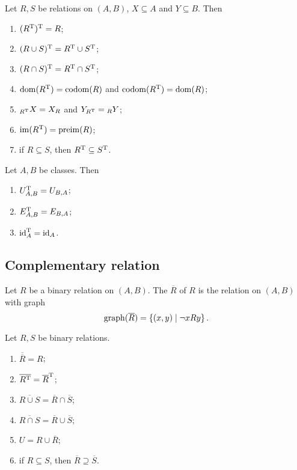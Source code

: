 \begin{lemma}
Let $R,S$ be relations on $(A, B)$, $X\subseteq A$ and $Y\subseteq B$. Then
\begin{enumerate}
\item $(R^{\mathrm{T}})^{\mathrm{T}} = R$;
\item $(R \cup S)^{\mathrm{T}} = R^{\mathrm{T}} \cup S^{\mathrm{T}}$;
\item $(R \cap S)^{\mathrm{T}} = R^{\mathrm{T}} \cap S^{\mathrm{T}}$;
\item $\operatorname{dom}(R^{\mathrm{T}}) = \operatorname{codom}(R)$ and $\operatorname{codom}(R^{\mathrm{T}}) = \operatorname{dom}(R)$;
\item $_{R^{\mathrm{T}}}X = X_R$ and $Y_{R^{\mathrm{T}}} = {_RY}$;
\item $\operatorname{im}(R^{\mathrm{T}}) = \operatorname{preim}(R)$;
\item if $R\subseteq S$, then $R^{\mathrm{T}} \subseteq S^{\mathrm{T}}$.
\end{enumerate}
\end{lemma}

\begin{lemma}
Let $A,B$ be classes. Then
\begin{enumerate}
\item $U_{A,B}^{\mathrm{T}} = U_{B,A}$;
\item $E_{A,B}^{\mathrm{T}} = E_{B,A}$;
\item $\operatorname{id}_A^{\mathrm{T}} = \operatorname{id}_A$.
\end{enumerate}
\end{lemma}

\subsection{Complementary relation}
\begin{definition}
Let $R$ be a binary relation on $(A, B)$. The  $\overline{R}$ of $R$ is the relation on $(A, B)$ with graph
\[ \operatorname{graph}(\overline{R}) = \left\{ (x,y) \;\middle|\; \neg xRy \right\}. \]
\end{definition}
\begin{lemma} \label{relationalComplementProperties}
Let $R,S$ be binary relations.
\begin{enumerate}
\item $\overline{\overline{R}} = R$;
\item $\overline{R^{\mathrm{T}}} = \overline{R}^{\mathrm{T}}$;
\item $\overline{R\cup S} = \overline{R}\cap \overline{S}$;
\item $\overline{R\cap S} = \overline{R}\cup \overline{S}$;
\item $U = R \cup \overline{R}$;
\item if $R \subseteq S$, then $\overline{R} \supseteq \overline{S}$.
\end{enumerate}
\end{lemma}


